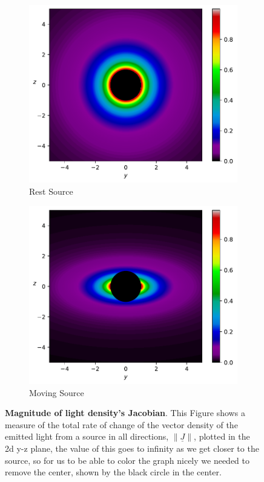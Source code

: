 \begin{figure}[H]
	\centering
	\begin{subfigure}{0.45\textwidth}
		\centering
		\includegraphics[width=\textwidth]{images/pdf/Density_of_Light_from_Rest_Source.pdf}
		\caption{Rest Source}
		\label{subfig_1: jacobian of vector density}
	\end{subfigure}
	\begin{subfigure}{0.45\textwidth}
		\centering
		\includegraphics[width=\textwidth]{images/pdf/Rate_of_Change_of_Vector_Density_of_Light_from_Moving_Source.pdf}
		\caption{Moving Source}
		\label{subfig_2: jacobian of vector density}
	\end{subfigure}
	\caption{\textbf{Magnitude of light density's Jacobian}. This Figure shows a measure of the total rate of change of the vector density of the emitted light from a source in all directions, $\| \underline{J} \|$, plotted in the 2d y-z plane, the value of this goes to infinity as we get closer to the source, so for us to be able to color the graph nicely we needed to remove the center, shown by the black circle in the center.}
	\label{fig: jacobian of vector density}
\end{figure}
